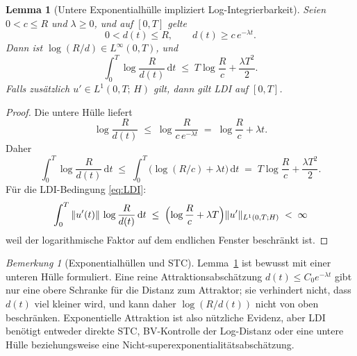 \documentclass[12pt,a4paper]{article}
\theoremstyle{definition}
\theoremstyle{plain}
\newtheorem{lemma}[definition]{Lemma}
\theoremstyle{remark}
\newtheorem{remark}[definition]{Bemerkung}
\begin{document}
\begin{lemma}[Untere Exponentialhülle impliziert Log-Integrierbarkeit]
\label{lem:stc-tracking}
Seien $0<c\le R$ und $\lambda\ge 0$, und auf $[0,T]$ gelte
\[
  0<d(t)\le R,
  \qquad
  d(t)\ge c\,e^{-\lambda t}.
\]
Dann ist $\log(R/d)\in L^\infty(0,T)$, und
\[
  \int_0^T \log\frac{R}{d(t)}\,\mathrm{d}t
  \;\le\;
  T\log\frac{R}{c} + \frac{\lambda T^2}{2}.
\]
Falls zusätzlich $u'\in L^1(0,T;\,H)$ gilt, dann gilt LDI auf $[0,T]$.
\end{lemma}

\begin{proof}
Die untere Hülle liefert
\[
  \log\frac{R}{d(t)}
  \;\le\;
  \log\frac{R}{c\,e^{-\lambda t}}
  \;=\;
  \log\frac{R}{c}+\lambda t.
\]
Daher
\[
  \int_0^T \log\frac{R}{d(t)}\,\mathrm{d}t
  \;\le\;
  \int_0^T \bigl(\log(R/c)+\lambda t\bigr)\,\mathrm{d}t
  \;=\;
  T\log\frac{R}{c}+\frac{\lambda T^2}{2}.
\]
Für die LDI-Bedingung \eqref{eq:LDI}:
\[
  \int_0^T \|u'(t)\|\,\log\frac{R}{d(t)}\,\mathrm{d}t
  \;\le\;
  \Bigl(\log\frac{R}{c}+\lambda T\Bigr)
  \|u'\|_{L^1(0,T;H)}
  \;<\; \infty
\]
weil der logarithmische Faktor auf dem endlichen Fenster beschränkt ist.
\end{proof}

\begin{remark}[Exponentialhüllen und STC]
\label{rem:exp-tracking-strongest}
Lemma~\ref{lem:stc-tracking} ist bewusst mit einer unteren Hülle
formuliert.  Eine reine Attraktionsabschätzung
$d(t)\le C_0e^{-\lambda t}$ gibt nur eine obere Schranke für die
Distanz zum Attraktor; sie verhindert nicht, dass $d(t)$ viel kleiner
wird, und kann daher $\log(R/d(t))$ nicht von oben beschränken.
Exponentielle Attraktion ist also nützliche Evidenz, aber LDI benötigt
entweder direkte STC, BV-Kontrolle der Log-Distanz oder eine untere
Hülle beziehungsweise eine Nicht-superexponentialitätsabschätzung.
\end{remark}
\end{document}
